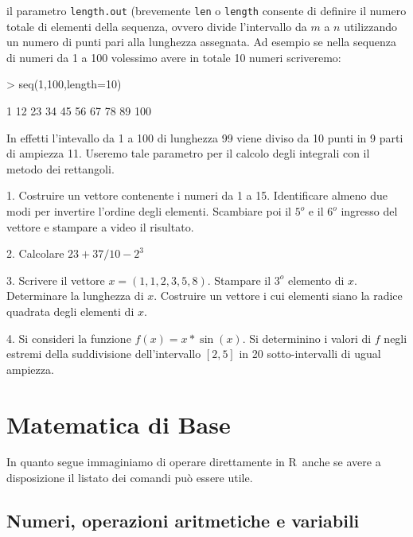 \documentclass[onecolumn,11pt]{book}
\newcommand{\rpr}{\textsf{R}~}
\begin{document}
il parametro \texttt{length.out}  (brevemente \texttt{len} o \texttt{length} consente di definire il numero totale di elementi della sequenza, ovvero divide l'intervallo  da $m$ a $n$ utilizzando un numero di punti pari alla lunghezza assegnata.
Ad esempio se nella  sequenza di numeri da 1 a 100 volessimo avere in totale 10 numeri scriveremo: 
\begin{Schunk}
\begin{Sinput}
> seq(1,100,length=10)
\end{Sinput}
\begin{Soutput}
 [1]   1  12  23  34  45  56  67  78  89 100
\end{Soutput}
\end{Schunk}
In effetti l'intevallo da 1 a 100  di lunghezza 99 viene diviso da 10 punti in 9 parti di ampiezza 11. Useremo tale parametro per il calcolo degli integrali con il metodo dei rettangoli.\\
  \begin{shaded}
  \begin{description}
\item{1.} Costruire un vettore contenente i numeri da 1 a 15. Identificare almeno due modi per invertire l'ordine degli elementi. Scambiare poi  il $5^o$  e il $6^o$ ingresso del vettore e stampare a video il risultato.
\item{2.} Calcolare $23+37/10-2^3$
\item{3.} Scrivere il vettore 
$x =(1,1,2,3,5,8)$.
Stampare il $3^o$  elemento di $x$. Determinare la lunghezza di $x$. 
Costruire un vettore i cui elementi siano la radice quadrata degli elementi di $x$.
\item{4.} Si consideri la funzione $f(x)=x*\sin(x)$. Si determinino i valori di $f$ negli estremi della suddivisione dell'intervallo $[2,5]$  in 20 sotto-intervalli di ugual ampiezza.
\end{description}
\end{shaded}
\chapter{Matematica di Base}
In quanto segue immaginiamo di operare direttamente in \rpr anche se avere a disposizione il listato dei comandi pu\`o essere utile.
\section{Numeri, operazioni aritmetiche e variabili}
\end{document}

